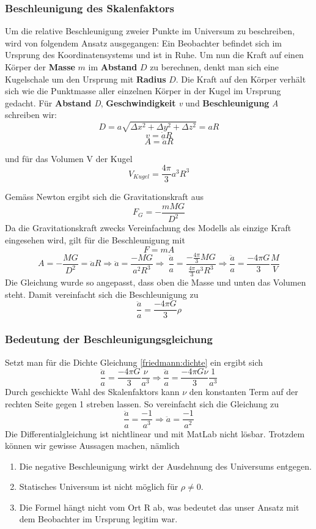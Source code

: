 \begin{refsection}
\subsubsection{Beschleunigung des Skalenfaktors}
Um die relative Beschleunigung zweier Punkte im Universum zu beschreiben, wird von folgendem Ansatz ausgegangen: Ein Beobachter befindet sich im Ursprung des Koordinatensystems und ist in Ruhe. Um nun die Kraft auf einen Körper der \textbf{Masse} $m$ im \textbf{Abstand} $D$ zu berechnen, denkt man sich eine Kugelschale um den Ursprung mit \textbf{Radius} $D$. Die Kraft auf den Körper verhält sich wie die Punktmasse aller  einzelnen Körper in der Kugel im Ursprung gedacht.
Für \textbf{Abstand} \textit{D}, \textbf{Geschwindigkeit} \textit{v} und \textbf{Beschleunigung} \textit{A} schreiben wir:
\[D =  a \sqrt{\Delta x^2 + \Delta y^2 + \Delta z^2}  = a R\]
\[v = \dot{a} R\]
\[A = \ddot{a} R\]

und für das Volumen V der Kugel
\[V_{Kugel} = \frac{4 \pi }{3} a^3 R^3\]

Gemäss Newton ergibt sich die Gravitationskraft aus
\begin{equation}
F_G = -\frac{m M G}{D^2}
\end{equation}
Da die Gravitationskraft zwecks Vereinfachung des Modells als einzige Kraft eingesehen wird, gilt für die Beschleunigung mit 
\[F = m A\]
\[A = - \frac{M G}{D^2} = \ddot{a} R \Rightarrow \ddot{a} = \frac{- M G}{a^2 R^3} \Rightarrow\ \frac{\ddot{a}}{a} = \frac{-\frac{4 \pi }{3} M G}{\frac{4 \pi}{3}a^3 R^3} \Rightarrow \frac{\ddot{a}}{a} = \frac{- 4 \pi G}{3} \frac{M}{V}\]
Die Gleichung wurde so angepasst, dass oben die Masse und unten das Volumen steht. Damit vereinfacht sich die Beschleunigung zu
\begin{equation}
\frac{\ddot{a}}{a} = \frac{- 4 \pi G}{3} \rho
\end{equation}
\subsubsection{Bedeutung der Beschleunigungsgleichung}
Setzt man für die Dichte Gleichung \ref{friedmann:dichte} ein ergibt sich
\[\frac{\ddot{a}}{a} = \frac{- 4 \pi G}{3} \frac{\nu}{a^3} \Rightarrow \frac{\ddot{a}}{a} = \frac{- 4 \pi G \nu}{3} \frac{1}{a^3}\]
Durch geschickte Wahl des Skalenfaktors kann $\nu$ den konstanten Term auf der rechten Seite gegen 1 streben lassen. So vereinfacht sich die Gleichung zu
\[\frac{\ddot{a}}{a} = \frac{-1}{a^3} \Rightarrow \ddot{a} = \frac{-1}{a^2}\]
Die Differentialgleichung ist nichtlinear und mit MatLab nicht lösbar. Trotzdem können wir gewisse Aussagen machen, nämlich
\begin{enumerate}
	\item Die negative Beschleunigung wirkt der Ausdehnung des Universums entgegen. 
	\item Statisches Universum ist nicht möglich für $\rho \neq 0$.
	\item Die Formel hängt nicht vom Ort R ab, was bedeutet das unser Ansatz mit dem Beobachter im Ursprung legitim war.
\end{enumerate}


\end{refsection}
